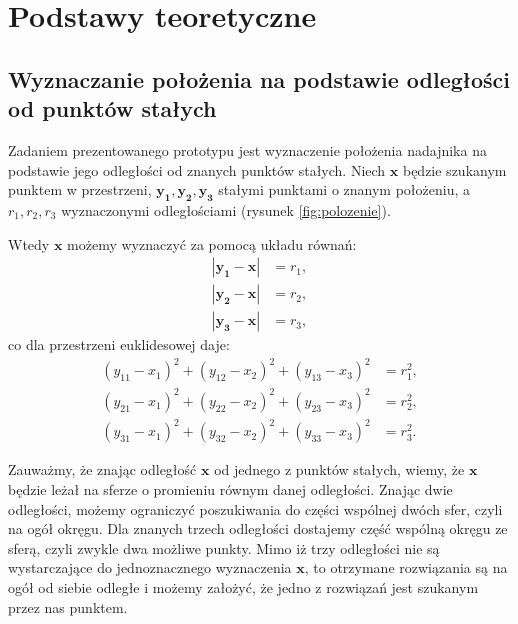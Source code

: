 \chapter{Podstawy teoretyczne}
\section{Wyznaczanie położenia na podstawie odległości od punktów stałych}

Zadaniem prezentowanego prototypu jest wyznaczenie położenia nadajnika na podstawie jego 
odległości od znanych punktów stałych. Niech $\boldsymbol{x}$ będzie szukanym punktem w przestrzeni,
$\boldsymbol{y_1,y_2,y_3}$ stałymi punktami o znanym położeniu, a $r_1,r_2,r_3$ wyznaczonymi odległościami
(rysunek \ref{fig:polozenie}).

Wtedy $\boldsymbol{x}$ możemy wyznaczyć za pomocą układu równań:
 \begin{align}
    \nonumber |\boldsymbol{y_1} - \boldsymbol{x}| &= r_1,
 \\ \nonumber |\boldsymbol{y_2} - \boldsymbol{x}| &= r_2,
 \\ \nonumber |\boldsymbol{y_3} - \boldsymbol{x}| &= r_3,
 \end{align}
co dla przestrzeni euklidesowej daje:
 \begin{align}  
    \nonumber   (y_{11}-x_1)^2 + (y_{12}-x_2)^2 + (y_{13}-x_3)^2 &= r_1^2,
 \\ \nonumber   (y_{21}-x_1)^2 + (y_{22}-x_2)^2 + (y_{23}-x_3)^2 &= r_2^2,
 \\ \nonumber   (y_{31}-x_1)^2 + (y_{32}-x_2)^2 + (y_{33}-x_3)^2 &= r_3^2.
 \end{align}

Zauważmy, że znając odległość $\boldsymbol{x}$ od jednego z punktów stałych, wiemy, że $\boldsymbol{x}$ będzie leżał na
sferze o promieniu równym danej odległości. Znając dwie odległości, możemy ograniczyć poszukiwania do części wspólnej dwóch sfer,
czyli na ogół okręgu. Dla znanych trzech odległości dostajemy część wspólną okręgu ze sferą, czyli zwykle dwa możliwe punkty.
Mimo iż trzy odległości nie są wystarczające do jednoznacznego wyznaczenia $\boldsymbol{x}$, 
to otrzymane rozwiązania są na ogół od siebie odległe i 
możemy założyć, że jedno z rozwiązań jest szukanym przez nas punktem.

